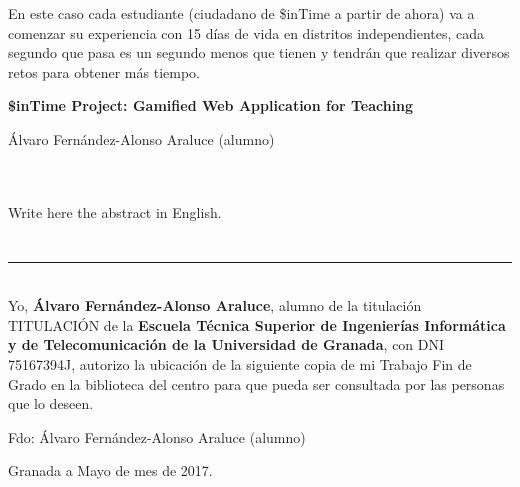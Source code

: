 En este caso cada estudiante (ciudadano de \$inTime a partir de ahora) va a comenzar su experiencia con 15 días de vida en distritos independientes, cada segundo que pasa es un segundo menos que tienen y tendrán que realizar diversos retos para obtener más tiempo.

\cleardoublepage


\thispagestyle{empty}


\begin{center}
{\large\bfseries \$inTime Project: Gamified Web Application for Teaching}\\
\end{center}
\begin{center}
Álvaro Fernández-Alonso Araluce (alumno)\\
\end{center}

\\

\vspace{0.7cm}
\\

Write here the abstract in English.

\chapter*{}
\thispagestyle{empty}

\noindent\rule[-1ex]{\textwidth}{2pt}\\[4.5ex]

Yo, \textbf{Álvaro Fernández-Alonso Araluce}, alumno de la titulación TITULACIÓN de la \textbf{Escuela Técnica Superior
de Ingenierías Informática y de Telecomunicación de la Universidad de Granada}, con DNI 75167394J, autorizo la
ubicación de la siguiente copia de mi Trabajo Fin de Grado en la biblioteca del centro para que pueda ser
consultada por las personas que lo deseen.

\vspace{6cm}

\noindent Fdo: Álvaro Fernández-Alonso Araluce (alumno)

\vspace{2cm}

\begin{flushright}
Granada a Mayo de mes de 2017.
\end{flushright}


